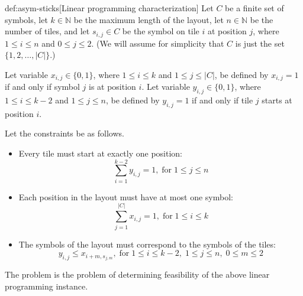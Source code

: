 \documentclass[draft]{article}
\theoremstyle{definition} \newtheorem{definition}[definition]{Definition}
\theoremstyle{definition} \newreptheorem{definition}{Definition}
\newcommand{\dash}{\mbox{-}}
\newcommand{\plain}[1]{\;\text{#1}\;}
\newcommand{\asticks}{ASYM\dash STICKS}
\begin{document}
  \begin{repdefinition}{def:asym-sticks}[Linear programming characterization]
    Let $C$ be a finite set of symbols, let $k\in\mathbb{N}$ be the maximum
    length of the layout, let $n\in\mathbb{N}$ be the number of tiles, and let
    $s_{i,j}\in C$ be the symbol on tile $i$ at position $j$, where $1\leq
    i\leq n$ and $0\leq j\leq 2$. (We will assume for simplicity that $C$ is
    just the set $\{1, 2,\ldots, |C|\}$.)

    Let variable $x_{i,j}\in\{0, 1\}$, where $1\leq i\leq k$ and $1\leq j\leq
    |C|$, be defined by $x_{i, j} = 1$ if and only if symbol $j$ is at position
    $i$. Let variable $y_{i,j}\in\{0, 1\}$, where $1\leq i\leq k-2$ and $1\leq
    j\leq n$, be defined by $y_{i, j} = 1$ if and only if tile $j$ starts at
    position $i$.
    
    Let the constraints be as follows.
    \begin{itemize}
    \item[] Every tile must start at exactly one position:
      \begin{displaymath}
        \sum_{i = 1}^{k - 2}{y_{i, j}} = 1, \plain{for} 1\leq j\leq n
      \end{displaymath}
    \item[] Each position in the layout must have at most one symbol:
      \begin{displaymath}
        \sum_{j = 1}^{|C|}{x_{i, j}} = 1, \plain{for} 1\leq i\leq k
      \end{displaymath}
    \item[] The symbols of the layout must correspond to the symbols of the
      tiles:
      \begin{displaymath}
        y_{i, j} \leq x_{i + m, s_{j, m}}, \plain{for} 1\leq i\leq k - 2,\;
        1\leq j\leq n,\; 0\leq m\leq 2
      \end{displaymath}
    \end{itemize}
    
    The \lang{\asticks} problem is the problem of determining feasibility of
    the above linear programming instance.
  \end{repdefinition}
\end{document}
